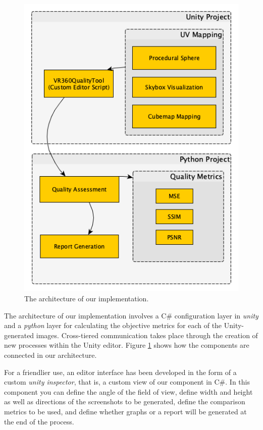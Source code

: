 \documentclass[12pt]{article}
\begin{document}
\begin{figure}[H]
\begin{minipage}[b]{0.4\textwidth}
        \includegraphics[width=\textwidth]{yed/tool_arch_en.png}
        \caption{The architecture of our implementation.}
        \label{fig:toolarch}
    \end{minipage}
\end{figure}


The architecture of our implementation involves a C\# configuration layer in \textit{unity} and a \textit{python} layer for calculating the objective metrics for each of the Unity-generated images. Cross-tiered communication takes place through the creation of new processes within the Unity editor. Figure \ref{fig:toolarch} shows how the components are connected in our architecture.

For a friendlier use, an editor interface has been developed in the form of a custom \textit{unity inspector}, that is, a custom view of our component in C\#. In this component you can define the angle of the field of view, define width and height as well as directions of the screenshots to be generated, define the comparison metrics to be used, and define whether graphs or a report will be generated at the end of the process.
\end{document}
